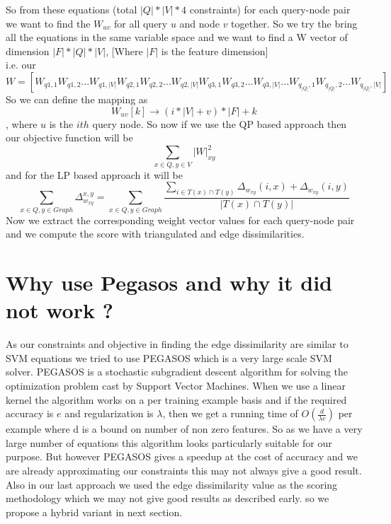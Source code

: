 So from these equations (total $|Q| * |V| * 4$ constraints) for each query-node pair  we want to find the $W_{uv}$ for all query $u$ and node $v$ together. So we try the bring all the equations in the same variable space and we want to find a W vector of dimension $|F|*|Q|*|V|$, [Where $|F|$ is the feature dimension]\\
i.e. our $$W = [W_{q1,1} W_{q1,2} ... W_{q1,|V|} W_{q2,1} W_{q2, 2} ... W_{q2,|V|} W_{q3,1} W_{q3,2} ... W_{q3,|V|}
... W_{q_{|Q|},1} W_{q_{|Q|}, 2} ... W_{q_{|Q|}, |V|}]$$
So we can define the mapping as
\begin{equation}
W_{uv} [k] \rightarrow (i*|V|+v)*|F| + k 
\end{equation}
, where $u$ is the $ith$ query node.
So now if we use the QP based approach then our objective function will be
\begin{equation}
\sum_{x \in Q, y \in V} |W|_{xy}^2
\end{equation}
and for the LP based approach it will be
\begin{equation}
\sum_{x \in Q,y \in Graph} \Delta_{w_{xy}}^{x,y} = \sum_{x \in Q,y \in Graph} \frac{\sum_{i \in T(x) \cap T(y)} \Delta_{w_{xy}}(i,x) + \Delta_{w_{xy}}(i,y)}{ |T(x) \cap T(y)|}
\end{equation}
Now we extract the corresponding weight vector values for each query-node pair and we compute the score with triangulated and edge dissimilarities.

\section*{Why use Pegasos and why it did not work ?}
As our constraints and objective in finding the edge dissimilarity are similar to SVM equations we tried to use PEGASOS which is a very large scale SVM solver. PEGASOS is a stochastic subgradient descent algorithm for solving the optimization problem cast by Support Vector Machines. When we use a linear kernel the algorithm works on a per training example basis and if the required accuracy is $e$ and regularization is $\lambda$, then we get a running time of $O(\frac {d}{\lambda e})$ per example where d is a bound on number of non zero features. So as we have a very large number of equations this algorithm looks particularly suitable for our purpose. But however PEGASOS gives a speedup at the cost of accuracy and we are already approximating our constraints this may not always give a good result. Also in our last approach we used the edge dissimilarity value as the scoring methodology which we may not give good results as described early. so we propose a hybrid variant in next section.

